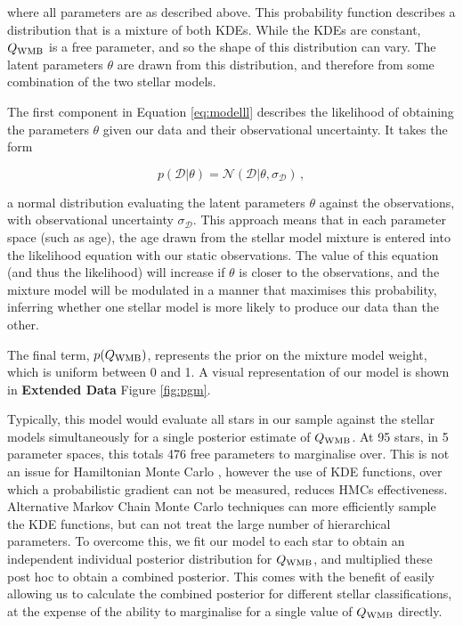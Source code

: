 \noindent where all parameters are as described above. This probability function describes a distribution that is a mixture of both KDEs. While the KDEs are constant, $Q_{\rm WMB}$ is a free parameter, and so the shape of this distribution can vary. The latent parameters $\theta$ are drawn from this distribution, and therefore from some combination of the two stellar models.

The first component in Equation \ref{eq:modelll} describes the likelihood of obtaining the parameters $\theta$ given our data and their observational uncertainty. It takes the form

\begin{equation}
	p(\mathcal{D} | \theta) = \mathcal{N}(\mathcal{D} | \theta, \sigma_{\mathcal{D}})\, ,
\end{equation}

\noindent a normal distribution evaluating the latent parameters $\theta$ against the observations, with observational uncertainty $\sigma_{\mathcal{D}}$. This approach means that in each parameter space (such as age), the age drawn from the stellar model mixture is entered into the likelihood equation with our static observations. The value of this equation (and thus the likelihood) will increase if $\theta$ is closer to the observations, and the mixture model will be modulated in a manner that maximises this probability, inferring whether one stellar model is more likely to produce our data than the other.

The final term, $p(Q_{\rm WMB})$, represents the prior on the mixture model weight, which is uniform between 0 and 1. A visual representation of our model is shown in \textbf{Extended Data} Figure \ref{fig:pgm}.

Typically, this model would evaluate all stars in our sample against the stellar models simultaneously for a single posterior estimate of $Q_{\rm WMB}$. At 95 stars, in 5 parameter spaces, this totals 476 free parameters to marginalise over. This is not an issue for Hamiltonian Monte Carlo \cite[HMC]{m_betancourt+girolami2013}, however the use of KDE functions, over which a probabilistic gradient can not be measured, reduces HMCs effectiveness. Alternative Markov Chain Monte Carlo techniques \cite[MCMC]{m_foreman-mackey+2013} can more efficiently sample the KDE functions, but can not treat the large number of hierarchical parameters. To overcome this, we fit our model to each star to obtain an independent individual posterior distribution for $Q_{\rm WMB}$, and multiplied these post hoc to obtain a combined posterior. This comes with the benefit of easily allowing us to calculate the combined posterior for different stellar classifications, at the expense of the ability to marginalise for a single value of $Q_{\rm WMB}$ directly.\\

